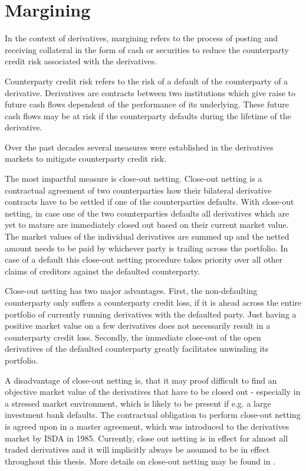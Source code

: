 \documentclass[../Thesis_AHoecherl.tex]{subfiles}
\begin{document}
\section{Margining}\label{Margining}

In the context of derivatives, margining refers to the process of posting and receiving collateral in the form of cash or securities to reduce the counterparty credit risk associated with the derivatives.

Counterparty credit risk refers to the risk of a default of the counterparty of a derivative. Derivatives are contracts between two institutions which give raise to future cash flows dependent of the performance of its underlying. These future cash flows may be at risk if the counterparty defaults during the lifetime of the derivative. 

Over the past decades several measures were established in the derivatives markets to mitigate counterparty credit risk.

The most impactful measure is close-out netting. Close-out netting is a contractual agreement of two counterparties how their bilateral derivative contracts have to be settled if one of the counterparties defaults. With close-out netting, in case one of the two counterparties defaults all derivatives which are yet to mature are immediately closed out based on their current market value. The market values of the individual derivatives are summed up and the netted amount needs to be paid by whichever party is trailing across the portfolio. In case of a default this close-out netting procedure takes priority over all other claims of creditors against the defaulted counterparty. 

Close-out netting has two major advantages. 
First, the non-defaulting counterparty only suffers a counterparty credit loss, if it is ahead across the entire portfolio of currently running derivatives with the defaulted party. Just having a positive market value on a few derivatives does not necessarily result in a counterparty credit loss. Secondly, the immediate close-out of the open derivatives of the defaulted counterparty greatly facilitates unwinding its portfolio. 

A disadvantage of close-out netting is, that it may proof difficult to find an objective market value of the derivatives that have to be closed out - especially in a stressed market environment, which is likely to be present if e.g. a large investment bank defaults. The contractual obligation to perform close-out netting is agreed upon in a master agreement, which was introduced to the derivatives market by \gls{ISDA} in 1985. Currently, close out netting is in effect for almost all traded derivatives and it will implicitly always be assumed to be in effect throughout this thesis. More details on close-out netting may be found in \cite[Chapter~5]{gregory2015xva}.
\end{document}
